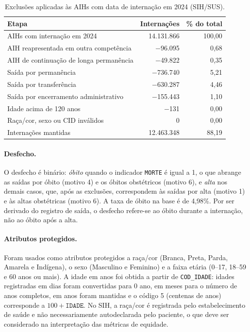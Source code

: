 \begin{table}[htbp]
  \centering
  \caption{Exclusões aplicadas às AIHs com data de internação em 2024 (SIH/SUS).}
  \label{tab:sih-funil}
  \begin{tabular}{lrr}
    \toprule
    Etapa & Internações & \% do total \\
    \midrule
    AIHs com internação em 2024 & 14.131.866 & 100,00 \\
    AIH reapresentada em outra competência & $-$96.095 & 0,68 \\
    AIH de continuação de longa permanência & $-$49.822 & 0,35 \\
    Saída por permanência & $-$736.740 & 5,21 \\
    Saída por transferência & $-$630.287 & 4,46 \\
    Saída por encerramento administrativo & $-$155.443 & 1,10 \\
    Idade acima de 120 anos & $-$131 & 0,00 \\
    Raça/cor, sexo ou CID inválidos & 0 & 0,00 \\
    \midrule
    Internações mantidas & 12.463.348 & 88,19 \\
    \bottomrule
  \end{tabular}
\end{table}

\paragraph{Desfecho.}
O desfecho é binário: \emph{óbito} quando o indicador \texttt{MORTE} é igual a 1,
o que abrange as saídas por óbito (motivo 4) e os óbitos obstétricos (motivo 6),
e \emph{alta} nos demais casos, que, após as exclusões, correspondem às saídas
por alta (motivo 1) e às altas obstétricas (motivo 6). A taxa de óbito na base é
de 4,98\%.
Por ser derivado do registro de saída, o desfecho refere-se ao óbito durante a
internação, não ao óbito após a alta.

\paragraph{Atributos protegidos.}
Foram usados como atributos protegidos a raça/cor (Branca, Preta, Parda,
Amarela e Indígena), o sexo (Masculino e Feminino) e a faixa etária (0--17,
18--59 e 60 anos ou mais). A idade em anos foi obtida a partir de
\texttt{COD\_IDADE}: idades registradas em dias foram convertidas para
0 ano, em meses para o número de anos completos, em anos foram mantidas e o
código 5 (centenas de anos) corresponde a $100 + \texttt{IDADE}$. No SIH, a
raça/cor é registrada pelo estabelecimento de saúde e não necessariamente
autodeclarada pelo paciente, o que deve ser considerado na interpretação das
métricas de equidade.

